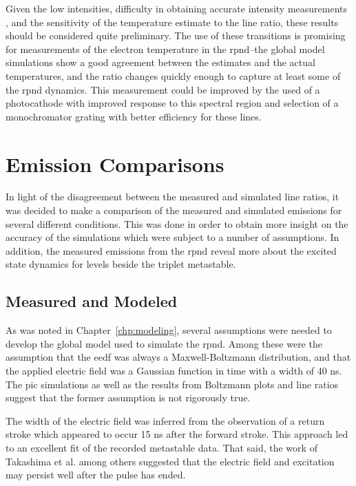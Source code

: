 Given the low intensities, difficulty in obtaining accurate intensity
measurements \cite{Griem2005}, and the sensitivity of the temperature estimate
to the line ratio, these results should be considered quite preliminary. The use
of these transitions is promising for measurements of the electron temperature
in the \acs{rpnd}--the global model simulations show a good agreement between
the estimates and the actual temperatures, and the ratio changes quickly enough
to capture at least some of the \acs{rpnd} dynamics. This measurement could be
improved by the used of a photocathode with improved response to this spectral
region and selection of a monochromator grating with better efficiency for these
lines.

\section{Emission Comparisons}

In light of the disagreement between the measured and simulated line ratios, it
was decided to make a comparison of the measured and simulated emissions for
several different conditions. This was done in order to obtain more insight on
the accuracy of the simulations which were subject to a number of assumptions.
In addition, the measured emissions from the \acs{rpnd} reveal more about the
excited state dynamics for levels beside the triplet metastable.

\subsection{Measured and Modeled}

As was noted in Chapter~\ref{chp:modeling}, several assumptions were needed to
develop the global model used to simulate the \acs{rpnd}. Among these were the
assumption that the \acs{eedf} was always a Maxwell-Boltzmann distribution, and
that the applied electric field was a Gaussian function in time with a width of
40 ns. The \acs{pic} simulations as well as the results from Boltzmann plots and
line ratios suggest that the former assumption is not rigorously true.

The width of the electric field was inferred from the observation of a return
stroke which appeared to occur 15 ns after the forward stroke. This approach led
to an excellent fit of the recorded metastable data. That said, the work of
Takashima et al. \cite{Takashima2011} among others \cite{Ito2010} suggested that
the electric field and excitation may persist well after the pulse has ended.

